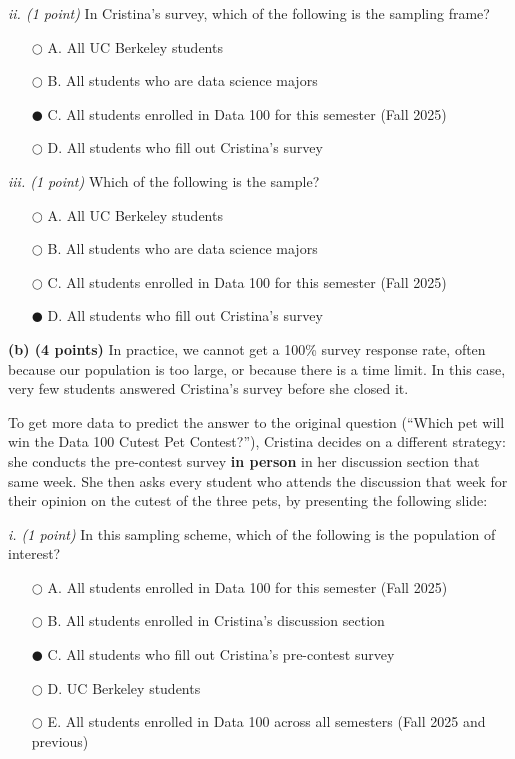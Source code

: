 \documentclass[11pt]{article}
\begin{document}
\textit{ii. (1 point)} In Cristina’s survey, which of the following is the sampling frame?
\begin{itemize} [leftmargin=4em]
    \item[$\bigcirc$] A. All UC Berkeley students
    \item[$\bigcirc$] B. All students who are data science majors
    \item[$\mdlgblkcircle$] C. All students enrolled in Data 100 for this semester (Fall 2025)
    \item[$\bigcirc$] D. All students who fill out Cristina’s survey
\end{itemize}

\textit{iii. (1 point)} Which of the following is the sample?
\begin{itemize} [leftmargin=4em]
    \item[$\bigcirc$] A. All UC Berkeley students
    \item[$\bigcirc$] B. All students who are data science majors
    \item[$\bigcirc$] C. All students enrolled in Data 100 for this semester (Fall 2025)
    \item[$\mdlgblkcircle$] D. All students who fill out Cristina’s survey
\end{itemize}

\newpage
\textbf{(b) (4 points)} In practice, we cannot get a 100\% survey response rate, often because our population is too large, or because there is a time limit. In this case, very few students answered Cristina’s survey before she closed it.

To get more data to predict the answer to the original question (“Which pet will win the Data 100 Cutest Pet Contest?”), Cristina decides on a different strategy: she conducts the pre-contest survey \textbf{in person} in her discussion section that same week. She then asks every student who attends the discussion that week for their opinion on the cutest of the three pets, by presenting the following slide:

\smallskip
\textit{i. (1 point)} In this sampling scheme, which of the following is the population of interest?
\begin{itemize} [leftmargin=4em]
    \item[$\bigcirc$] A. All students enrolled in Data 100 for this semester (Fall 2025)
    \item[$\bigcirc$] B. All students enrolled in Cristina’s discussion section
    \item[$\mdlgblkcircle$] C. All students who fill out Cristina’s pre-contest survey
    \item[$\bigcirc$] D. UC Berkeley students
    \item[$\bigcirc$] E. All students enrolled in Data 100 across all semesters (Fall 2025 and previous)
\end{itemize}
\end{document}
